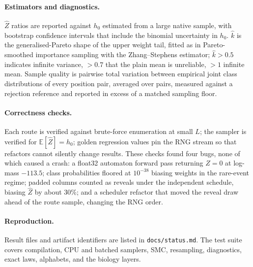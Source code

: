\documentclass[11pt]{article}
\theoremstyle{definition}
\newcommand{\E}{\mathbb{E}}
\newcommand{\Zh}{\widehat Z}
\begin{document}
\paragraph{Estimators and diagnostics.}
$\Zh$ ratios are reported against $h_0$ estimated from a large native sample, with bootstrap confidence intervals
that include the binomial uncertainty in $h_0$. $\hat k$ is the generalised-Pareto shape of the upper weight tail,
fitted as in Pareto-smoothed importance sampling with the Zhang--Stephens estimator; $\hat k>0.5$ indicates
infinite variance, $>0.7$ that the plain mean is unreliable, $>1$ infinite mean. Sample quality is pairwise total
variation between empirical joint class distributions of every position pair, averaged over pairs, measured
against a rejection reference and reported in excess of a matched sampling floor.

\paragraph{Correctness checks.}
Each route is verified against brute-force enumeration at small $L$; the sampler is verified for $\E[\Zh]=h_0$;
golden regression values pin the RNG stream so that refactors cannot silently change results. These checks found
four bugs, none of which caused a crash: a float32 automaton forward pass returning
$Z=0$ at log-mass $-113.5$; class probabilities floored at $10^{-38}$ biasing weights in the rare-event regime;
padded columns counted as reveals under the independent schedule, biasing $\Zh$ by about 30\%; and a scheduler
refactor that moved the reveal draw ahead of the route sample, changing the RNG order.

\paragraph{Reproduction.}
Result files and artifact identifiers are listed in \texttt{docs/status.md}. The test suite covers compilation,
CPU and batched samplers, SMC, resampling, diagnostics, exact laws, alphabets, and the biology layers.
\end{document}
